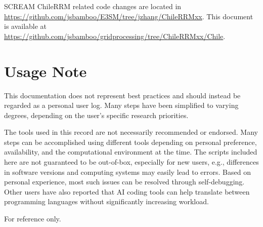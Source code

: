 \documentclass[journal abbreviation, manuscript]{copernicus}
\begin{document}
SCREAM ChileRRM related code changes are located in \url{https://github.com/jsbamboo/E3SM/tree/jzhang/ChileRRMxx}. This document is available at \url{https://github.com/jsbamboo/gridprocessing/tree/ChileRRMxx/Chile}.


\section{Usage Note}
This documentation does not represent best practices and should instead be regarded as a personal user log. Many steps have been simplified to varying degrees, depending on the user's specific research priorities. 

The tools used in this record are not necessarily recommended or endorsed. Many steps can be accomplished using different tools depending on personal preference, availability, and the computational environment at the time. The scripts included here are not guaranteed to be out-of-box, especially for new users, e.g., differences in software versions and computing systems may easily lead to errors. Based on personal experience, most such issues can be resolved through self-debugging. Other users have also reported that AI coding tools can help translate between programming languages without significantly increasing workload.

For reference only.

\newpage
\end{document}
